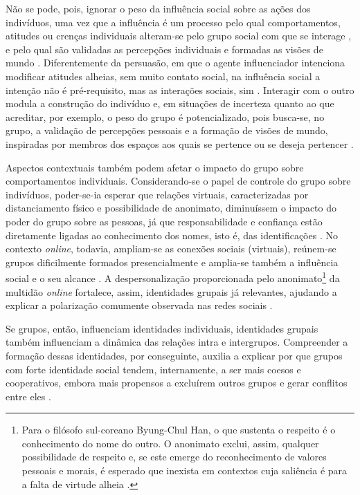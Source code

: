 \documentclass[portuguese]{textolivre}
\begin{document}
Não se pode, pois, ignorar o peso da influência social sobre as ações dos indivíduos, uma vez que a influência é um processo pelo qual comportamentos, atitudes ou crenças individuais alteram-se pelo grupo social com que se interage \cite{fiske2014social}, e pelo qual são validadas as percepções individuais e formadas as visões de mundo \cite{spears2021social}. Diferentemente da persuasão, em que o agente influenciador intenciona modificar atitudes alheias, sem muito contato social, na influência social a intenção não é pré-requisito, mas as interações sociais, sim \cite{fiske2014social}. Interagir com o outro modula a construção do indivíduo e, em situações de incerteza quanto ao que acreditar, por exemplo, o peso do grupo é potencializado, pois busca-se, no grupo, a validação de percepções pessoais e a formação de visões de mundo, inspiradas por membros dos espaços aos quais se pertence ou se deseja pertencer \cite{spears2021social}.

Aspectos contextuais também podem afetar o impacto do grupo sobre comportamentos individuais. Considerando-se o papel de controle do grupo sobre indivíduos, poder-se-ia esperar que relações virtuais, caracterizadas por distanciamento físico e possibilidade de anonimato, diminuíssem o impacto do poder do grupo sobre as pessoas, já que responsabilidade e confiança estão diretamente ligadas ao conhecimento dos nomes, isto é, das identificações \cite{han2018no}. No contexto \emph{online}, todavia, ampliam-se as conexões sociais (virtuais), reúnem-se grupos dificilmente formados presencialmente e amplia-se também a influência social e o seu alcance \cite{spears2021social}. A despersonalização proporcionada pelo anonimato\footnote{Para o filósofo sul-coreano Byung-Chul Han, o que sustenta o respeito é o conhecimento do nome do outro. O anonimato exclui, assim, qualquer possibilidade de respeito e, se este emerge do reconhecimento de valores pessoais e morais, é esperado que inexista em contextos cuja saliência é para a falta de virtude alheia \cite{han2018no}.} da multidão \textit{online} fortalece, assim, identidades grupais já relevantes, ajudando a explicar a polarização comumente observada nas redes sociais \cite{spears2021social}.

Se grupos, então, influenciam identidades individuais, identidades grupais também influenciam a dinâmica das relações intra e intergrupos. Compreender a formação dessas identidades, por conseguinte, auxilia a explicar por que grupos com forte identidade social tendem, internamente, a ser mais coesos e cooperativos, embora mais propensos a excluírem outros grupos e gerar conflitos entre eles \cite{dovidio2020}.
\end{document}
